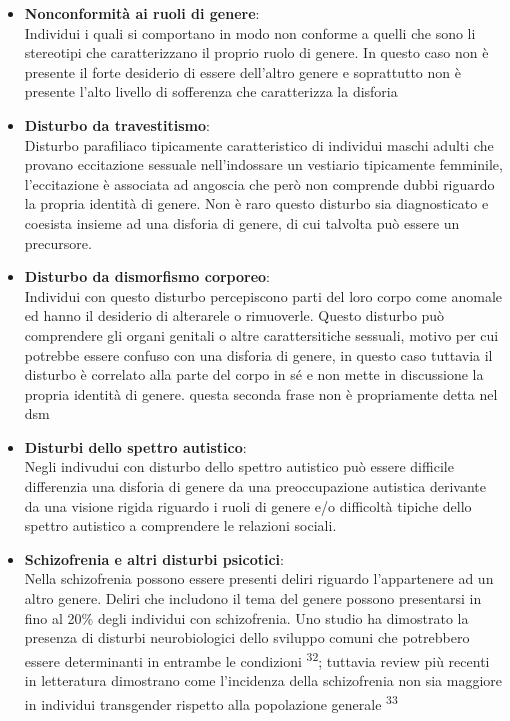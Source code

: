 \documentclass[11pt]{article}
\makeatletter
\newcommand{\cslcitation}[2]
 {\protect\hyper@linkstart{cite}{citeproc_bib_item_#1}#2\hyper@linkend}
\makeatother
\begin{document}
\begin{enumerate}
\begin{itemize}
\item \textbf{Nonconformità ai ruoli di genere}: \\
Individui i quali si comportano in modo non conforme a quelli che sono li stereotipi che caratterizzano il proprio ruolo di genere. In questo caso non è presente il forte desiderio di essere dell'altro genere e soprattutto non è presente l'alto livello di sofferenza che caratterizza la disforia

\item \textbf{Disturbo da travestitismo}: \\
Disturbo parafiliaco tipicamente caratteristico di individui maschi adulti che provano eccitazione sessuale nell'indossare un vestiario tipicamente femminile, l'eccitazione è associata ad angoscia che però non comprende dubbi riguardo la propria identità di genere.
Non è raro questo disturbo sia diagnosticato e coesista insieme ad una disforia di genere, di cui talvolta può essere un precursore.

\item \textbf{Disturbo da dismorfismo corporeo}: \\
Individui con questo disturbo percepiscono parti del loro corpo come anomale ed hanno il desiderio di alterarele o rimuoverle.
Questo disturbo può comprendere gli organi genitali o altre carattersitiche sessuali, motivo per cui potrebbe essere confuso con una disforia di genere, in questo caso tuttavia il disturbo è correlato alla parte del corpo in sé e non mette in discussione la propria identità di genere.
 questa seconda frase non è propriamente detta nel dsm
\end{itemize}


\begin{itemize}
\item \textbf{Disturbi dello spettro autistico}: \\
Negli indivudui con disturbo dello spettro autistico può essere difficile differenzia una disforia di genere da una preoccupazione autistica derivante da una visione rigida riguardo i ruoli di genere e/o difficoltà tipiche dello spettro autistico a comprendere le relazioni sociali.
\end{itemize}



\begin{itemize}
\item \textbf{Schizofrenia e altri disturbi psicotici}: \\
Nella schizofrenia possono essere presenti deliri riguardo l'appartenere ad un altro genere. Deliri che includono il tema del genere possono presentarsi in fino al 20\% degli individui con schizofrenia.
Uno studio ha dimostrato la presenza di disturbi neurobiologici dello sviluppo comuni che potrebbero essere determinanti in entrambe le condizioni \textsuperscript{\cslcitation{32}{32}}; tuttavia review più recenti in letteratura dimostrano come l'incidenza della schizofrenia non sia maggiore in individui transgender rispetto alla popolazione generale \textsuperscript{\cslcitation{33}{33}}


\end{itemize}
\end{enumerate}
\end{document}
